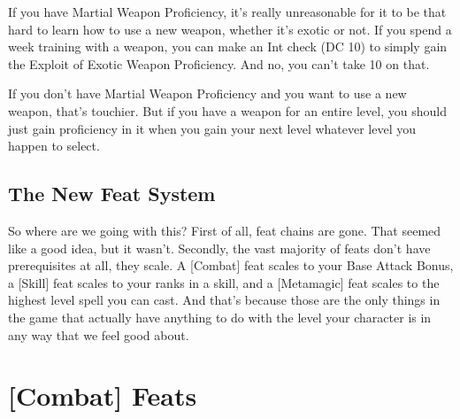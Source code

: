 If you have Martial Weapon Proficiency, it's really unreasonable for it to be that hard to learn how to use a new weapon, whether it's exotic or not. If you spend a week training with a weapon, you can make an Int check (DC 10) to simply gain the Exploit of Exotic Weapon Proficiency. And no, you can't take 10 on that.

If you don't have Martial Weapon Proficiency and you want to use a new weapon, that's touchier. But if you have a weapon for an entire level, you should just gain proficiency in it when you gain your next level whatever level you happen to select.

\subsection{The New Feat System}

So where are we going with this? First of all, feat chains are gone. That seemed like a good idea, but it wasn't. Secondly, the vast majority of feats don't have prerequisites at all, they scale. A [Combat] feat scales to your Base Attack Bonus, a [Skill] feat scales to your ranks in a skill, and a [Metamagic] feat scales to the highest level spell you can cast. And that's because those are the only things in the game that actually have anything to do with the level your character is in any way that we feel good about.

\section{[Combat] Feats} \label{feats:combat}

